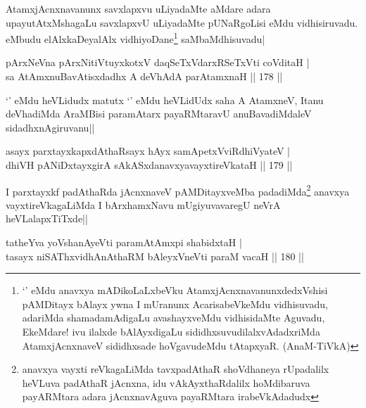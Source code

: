 \begin{artha}
AtamxjAcnxnavanunx savxlapxvu uLiyadaMte aMdare adara upayutAtxMshagaLu savxlapxvU uLiyadaMte pUNaRgoLisi \stext eMdu vidhisiruvadu. \stext  eMbudu elAlxkaDeyalAlx vidhiyoDane\footnote[2]{`\stext ' eMdu anavxya mADikoLaLxbeVku AtamxjAcnxnavanunxdedxVshisi pAMDitayx bAlayx ywna I mUranunx AcarisabeVkeMdu vidhisuvadu, adariMda shamadamAdigaLu avashayxveMdu vidhisidaMte Aguvadu, EkeMdare! ivu ilalxde bAlAyxdigaLu sididhxsuvudilalxvAdadxriMda AtamxjAcnxnaveV sididhxsade hoVgavudeMdu tAtapxyaR. (AnaM-TiVkA)} saMbaMdhisuvadu|
\end{artha}


\begin{shl}
pArxNeVna pArxNitiVtuyxkotxV daqSeTxVdarxRSeTxVti coVditaH |\\
sa AtAmx\s nuBavAtisxdadhx A deVhAdA parAtamxnaH \hfill || 178 ||
\end{shl}

\begin{artha}
`\stext ' eMdu heVLidudx matutx `\stext ' eMdu heVLidUdx saha A AtamxneV, Itanu deVhadiMda AraMBisi paramAtarx payaRMtaravU anuBavadiMdaleV sidadhxnAgiruvanu||
\end{artha}


\begin{shl}
asayx parxtayxkapxdAthaRsayx hAyx samApetxVviRdhiVyateV |\\
dhiVH pANiDxtayxgirA sAkASxdanavxyavayxtireVkataH \hfill || 179 ||
\end{shl}

\begin{artha}
I parxtayxkf padAthaRda jAcnxnaveV pAMDitayxveMba padadiMda\footnote[1]{anavxya vayxti reVkagaLiMda tavxpadAthaR shoVdhaneya rUpadalilx heVLuva padAthaR jAcnxna, idu vAkAyxthaRdalilx hoMdibaruva payARMtara adara jAcnxnavAguva payaRMtara irabeVkAdadudx} anavxya vayxtireVkagaLiMda I bArxhamxNavu mUgiyuvavaregU neVrA heVLalapxTiTxde||
\end{artha}


\begin{shl}
tatheYva yoV\s shanAyeVti paramAtAmx\s pi shabidxtaH |\\
tasayx niSAThxvidhAnAthaRM bAleyxVneVti paraM vacaH \hfill || 180 ||
\end{shl}

